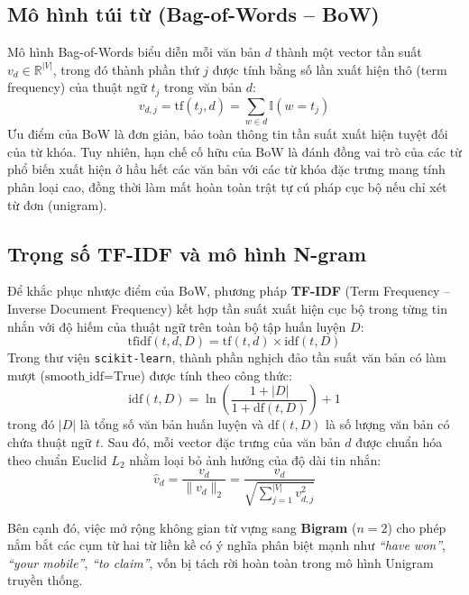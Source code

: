 \documentclass[12pt,a4paper]{report}
\begin{document}
\subsection{Mô hình túi từ (Bag-of-Words -- BoW)}
Mô hình Bag-of-Words biểu diễn mỗi văn bản $d$ thành một vector tần suất $v_d \in \mathbb{R}^{|V|}$, trong đó thành phần thứ $j$ được tính bằng số lần xuất hiện thô (term frequency) của thuật ngữ $t_j$ trong văn bản $d$:
\begin{equation}
    v_{d, j} = \text{tf}(t_j, d) = \sum_{w \in d} \mathbb{I}(w = t_j)
\end{equation}
Ưu điểm của BoW là đơn giản, bảo toàn thông tin tần suất xuất hiện tuyệt đối của từ khóa. Tuy nhiên, hạn chế cố hữu của BoW là đánh đồng vai trò của các từ phổ biến xuất hiện ở hầu hết các văn bản với các từ khóa đặc trưng mang tính phân loại cao, đồng thời làm mất hoàn toàn trật tự cú pháp cục bộ nếu chỉ xét từ đơn (unigram).

\subsection{Trọng số TF-IDF và mô hình N-gram}
Để khắc phục nhược điểm của BoW, phương pháp \textbf{TF-IDF} (Term Frequency -- Inverse Document Frequency) kết hợp tần suất xuất hiện cục bộ trong từng tin nhắn với độ hiếm của thuật ngữ trên toàn bộ tập huấn luyện $D$:
\begin{equation}
    \text{tfidf}(t, d, D) = \text{tf}(t, d) \times \text{idf}(t, D)
\end{equation}
Trong thư viện \texttt{scikit-learn}, thành phần nghịch đảo tần suất văn bản có làm mượt ($\text{smooth\_idf=True}$) được tính theo công thức:
\begin{equation}
    \text{idf}(t, D) = \ln \left( \frac{1 + |D|}{1 + \text{df}(t, D)} \right) + 1
\end{equation}
trong đó $|D|$ là tổng số văn bản huấn luyện và $\text{df}(t, D)$ là số lượng văn bản có chứa thuật ngữ $t$. Sau đó, mỗi vector đặc trưng của văn bản $d$ được chuẩn hóa theo chuẩn Euclid $L_2$ nhằm loại bỏ ảnh hưởng của độ dài tin nhắn:
\begin{equation}
    \hat{v}_d = \frac{v_d}{\|v_d\|_2} = \frac{v_d}{\sqrt{\sum_{j=1}^{|V|} v_{d,j}^2}}
\end{equation}

Bên cạnh đó, việc mở rộng không gian từ vựng sang \textbf{Bigram} ($n=2$) cho phép nắm bắt các cụm từ hai từ liền kề có ý nghĩa phân biệt mạnh như \textit{``have won''}, \textit{``your mobile''}, \textit{``to claim''}, vốn bị tách rời hoàn toàn trong mô hình Unigram truyền thống.
\end{document}
